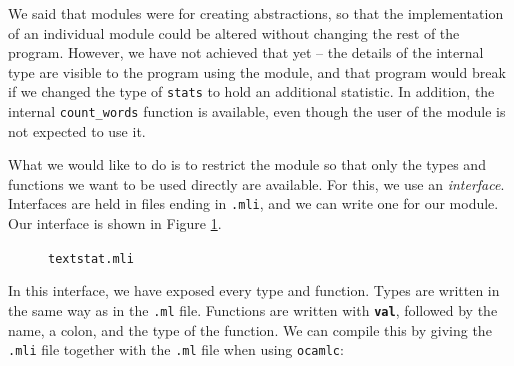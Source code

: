 \documentclass[]{book}
\begin{document}
We said that modules were for creating abstractions, so that the implementation of an individual module could be altered without changing the rest of the program. However, we have not achieved that yet -- the details of the internal type are visible to the program using the module, and that program would break if we changed the type of \texttt{stats} to hold an additional statistic. In addition, the internal \texttt{count\_words} function is available, even though the user of the module is not expected to use it.

What we would like to do is to restrict the module so that only the types and functions we want to be used directly are available. For this, we use an \textit{interface}. Interfaces are held in files ending in \texttt{.mli}, and we can write one for our module. Our interface is shown in Figure \ref{textstat.mli}.

\begin{figure}
\begin{center}
\end{center}
\caption{\small\texttt{textstat.mli}}
\label{textstat.mli}
\end{figure}


In this interface, we have exposed every type and function. Types are written in the same way as in the \texttt{.ml} file. Functions are written with \texttt{\textbf{val}}, followed by the name, a colon, and the type of the function. We can compile this by giving the\! \texttt{.mli} file together with the\! \texttt{.ml} file when using \texttt{ocamlc}:
\end{document}
